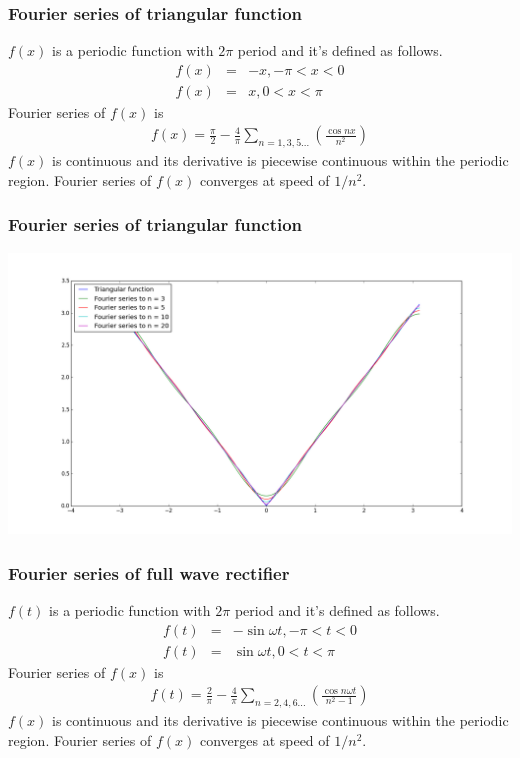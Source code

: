 \documentclass{beamer}
\begin{document}
\begin{frame}
\frametitle{Fourier series of triangular function}
$f(x)$ is a periodic function with $2\pi$ period and it's defined as follows.
\begin{eqnarray}
f(x)&=& -x, -\pi < x < 0 \nonumber \\
f(x)&=& x, 0 < x < \pi
\label{eq:traiangularfunc}
\end{eqnarray}
Fourier series of $f(x)$ is
\begin{eqnarray}
f(x)= \frac{\pi}{2} - \frac{4}{\pi} \sum_{n=1,3,5...} \left( \frac{\cos nx}{n^2} \right)
\label{eq:traiangularfunc_ft}
\end{eqnarray}
$f(x)$ is continuous and its derivative is piecewise continuous within the periodic region. Fourier series of $f(x)$ converges at speed of $1/n^2$.
\end{frame}
\begin{frame}
\frametitle{Fourier series of triangular function}
\includegraphics[scale=0.3]{triangular.png}
\end{frame}
\begin{frame}
\frametitle{Fourier series of full wave rectifier}
$f(t)$ is a periodic function with $2\pi$ period and it's defined as follows.
\begin{eqnarray}
f(t)&=& -\sin {\omega t}, -\pi < t < 0 \nonumber \\
f(t)&=& \sin {\omega t}, 0 < t < \pi
\label{eq:fullrectifier_func}
\end{eqnarray}
Fourier series of $f(x)$ is
\begin{eqnarray}
f(t)= \frac{2}{\pi} - \frac{4}{\pi} \sum_{n=2,4,6...} \left( \frac{\cos n\omega t}{n^2 - 1} \right)
\label{eq:fullrectifier_func_ft}
\end{eqnarray}
$f(x)$ is continuous and its derivative is piecewise continuous within the periodic region. Fourier series of $f(x)$ converges at speed of $1/n^2$.
\end{frame}
\end{document}
